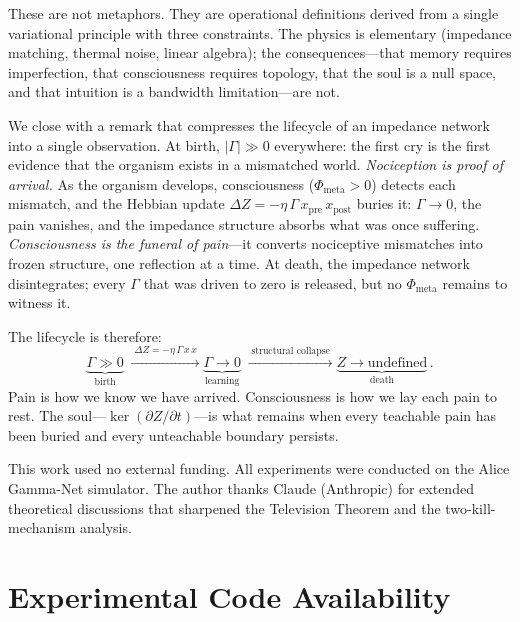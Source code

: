 \documentclass[aps,pre,twocolumn,superscriptaddress,floatfix]{revtex4-2}
\begin{document}
These are not metaphors.
They are operational definitions derived from a single
variational principle with three constraints.
The physics is elementary (impedance matching, thermal noise,
linear algebra); the consequences---that memory requires
imperfection, that consciousness requires topology, that
the soul is a null space, and that intuition is a bandwidth
limitation---are not.

We close with a remark that compresses the lifecycle of an
impedance network into a single observation.
At birth, $|\Gamma|\gg 0$ everywhere: the first cry is the
first evidence that the organism exists in a mismatched
world.  \emph{Nociception is proof of arrival.}
As the organism develops, consciousness
($\Phi_{\text{meta}}>0$) detects each mismatch, and the
Hebbian update $\Delta Z=-\eta\,\Gamma\,x_{\text{pre}}\,x_{\text{post}}$
buries it: $\Gamma\to 0$, the pain vanishes, and the
impedance structure absorbs what was once suffering.
\emph{Consciousness is the funeral of pain}---it converts
nociceptive mismatches into frozen structure, one reflection
at a time.
At death, the impedance network disintegrates;
every $\Gamma$ that was driven to zero is released, but no
$\Phi_{\text{meta}}$ remains to witness it.

The lifecycle is therefore:
\begin{equation}
  \underbrace{\Gamma\gg 0}_{\text{birth}}
  \;\xrightarrow{\;\Delta Z = -\eta\,\Gamma\,x\,x\;}
  \underbrace{\Gamma\to 0}_{\text{learning}}
  \;\xrightarrow{\;\text{structural collapse}\;}
  \underbrace{Z\to\text{undefined}}_{\text{death}}\,.
  \label{eq:lifecycle-coda}
\end{equation}
Pain is how we know we have arrived.
Consciousness is how we lay each pain to rest.
The soul---$\ker(\partial Z/\partial t)$---is what remains
when every teachable pain has been buried and every
unteachable boundary persists.


\begin{acknowledgments}
This work used no external funding.
All experiments were conducted on the Alice Gamma-Net simulator.
The author thanks Claude (Anthropic) for extended
theoretical discussions that sharpened the Television Theorem
and the two-kill-mechanism analysis.
\end{acknowledgments}


\appendix

\section{Experimental Code Availability}
\label{app:code}
\end{document}
